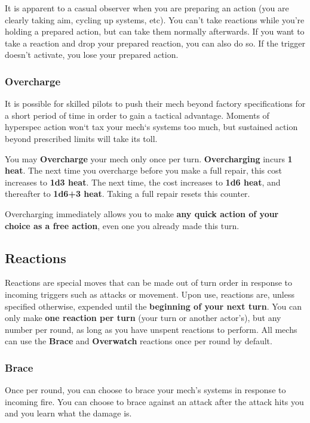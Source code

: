 It is apparent to a casual observer when you are preparing an action (you are clearly taking aim, cycling up systems, etc). You can’t take reactions while you’re holding a prepared action, but can take them normally afterwards. If you want to take a reaction and drop your prepared reaction, you can also do so. If the trigger doesn’t activate, you lose your prepared action.


\subsubsection{Overcharge}
It is possible for skilled pilots to push their mech beyond factory specifications for a short period of time in order to gain a tactical advantage. Moments of hyperspec action won‘t tax your mech‘s systems too much, but sustained action beyond prescribed limits will take its toll. 

You may \textbf{Overcharge} your mech only once per turn. \textbf{Overcharging} incurs \textbf{1 heat}. The next time you overcharge before you make a full repair, this cost increases to \textbf{1d3 heat}. The next time, the cost increases to \textbf{1d6 heat}, and thereafter to \textbf{1d6+3 heat}. Taking a full repair resets this counter.

Overcharging immediately allows you to make \textbf{any quick action of your choice as a free action}, even one you already made this turn.


\subsection{Reactions}
Reactions are special moves that can be made out of turn order in response to incoming triggers such as attacks or movement. Upon use, reactions are, unless specified otherwise, expended until the \textbf{beginning of your next turn}. You can only make \textbf{one reaction per turn} (your turn or another actor’s), but any number per round, as long as you have unspent reactions to perform. All mechs can use the \textbf{Brace} and \textbf{Overwatch} reactions once per round by default.

\subsubsection{Brace}
Once per round, you can choose to brace your mech’s systems in response to incoming fire. You can choose to brace against an attack after the attack hits you and you learn what the damage is.

